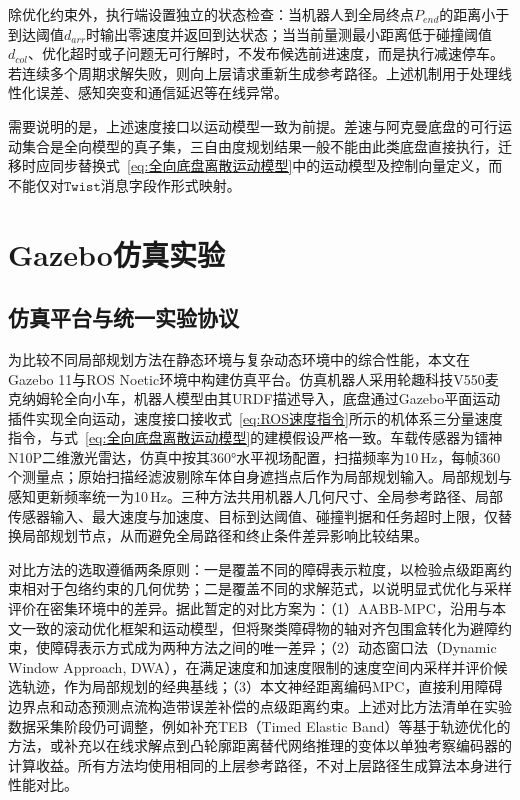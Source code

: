 除优化约束外，执行端设置独立的状态检查：当机器人到全局终点$P_{end}$的距离小于到达阈值$d_{arr}$时输出零速度并返回到达状态；当当前量测最小距离低于碰撞阈值$d_{col}$、优化超时或子问题无可行解时，不发布候选前进速度，而是执行减速停车。若连续多个周期求解失败，则向上层请求重新生成参考路径。上述机制用于处理线性化误差、感知突变和通信延迟等在线异常。

需要说明的是，上述速度接口以运动模型一致为前提。差速与阿克曼底盘的可行运动集合是全向模型的真子集，三自由度规划结果一般不能由此类底盘直接执行，迁移时应同步替换式~\eqref{eq:全向底盘离散运动模型}中的运动模型及控制向量定义，而不能仅对$\texttt{Twist}$消息字段作形式映射。

\section{Gazebo仿真实验}
\subsection{仿真平台与统一实验协议}
为比较不同局部规划方法在静态环境与复杂动态环境中的综合性能，本文在Gazebo 11与ROS Noetic环境中构建仿真平台。仿真机器人采用轮趣科技V550麦克纳姆轮全向小车，机器人模型由其URDF描述导入，底盘通过Gazebo平面运动插件实现全向运动，速度接口接收式~\eqref{eq:ROS速度指令}所示的机体系三分量速度指令，与式~\eqref{eq:全向底盘离散运动模型}的建模假设严格一致。车载传感器为镭神N10P二维激光雷达，仿真中按其360°水平视场配置，扫描频率为10\,Hz，每帧360个测量点；原始扫描经滤波剔除车体自身遮挡点后作为局部规划输入。局部规划与感知更新频率统一为10\,Hz。三种方法共用机器人几何尺寸、全局参考路径、局部传感器输入、最大速度与加速度、目标到达阈值、碰撞判据和任务超时上限，仅替换局部规划节点，从而避免全局路径和终止条件差异影响比较结果。

对比方法的选取遵循两条原则：一是覆盖不同的障碍表示粒度，以检验点级距离约束相对于包络约束的几何优势；二是覆盖不同的求解范式，以说明显式优化与采样评价在密集环境中的差异。据此暂定的对比方案为：（1）AABB-MPC，沿用与本文一致的滚动优化框架和运动模型，但将聚类障碍物的轴对齐包围盒转化为避障约束，使障碍表示方式成为两种方法之间的唯一差异；（2）动态窗口法（Dynamic Window Approach, DWA），在满足速度和加速度限制的速度空间内采样并评价候选轨迹，作为局部规划的经典基线；（3）本文神经距离编码MPC，直接利用障碍边界点和动态预测点流构造带误差补偿的点级距离约束。上述对比方法清单在实验数据采集阶段仍可调整，例如补充TEB（Timed Elastic Band）等基于轨迹优化的方法，或补充以在线求解点到凸轮廓距离替代网络推理的变体以单独考察编码器的计算收益。所有方法均使用相同的上层参考路径，不对上层路径生成算法本身进行性能对比。

